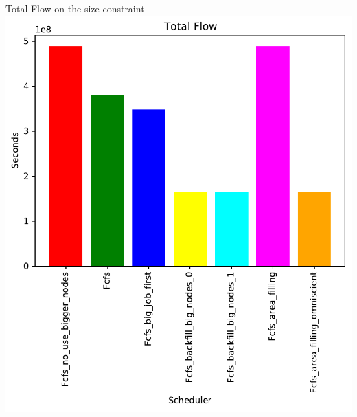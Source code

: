 \documentclass{libs/ufc_format}
\begin{document}
{\begin{frame}{Total Flow on the size constraint}
	\center\includegraphics[scale=0.48]{../MBSS/plot/Size_Constraint_2022-02-08->2022-02-08_very_reduced_Total_flow_95_128_4_256_1_1024.pdf}
\end{frame}


}
\end{document}
